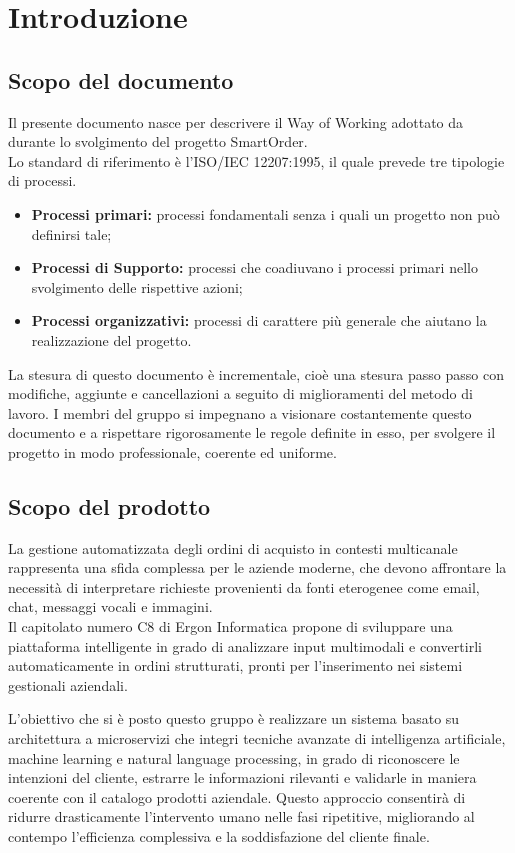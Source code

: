 \section{Introduzione}
	\subsection{Scopo del documento}
	Il presente documento nasce per descrivere il Way of Working adottato da \textbf{} durante lo svolgimento del progetto SmartOrder.\\
	Lo standard di riferimento è l'ISO/IEC 12207:1995, il quale prevede tre tipologie di processi.
	\begin{itemize}
	    \setlength\itemsep{-0.1em}
	    \item \textbf{Processi primari:} processi fondamentali senza i quali un progetto non può definirsi tale;
	    \item \textbf{Processi di Supporto:} processi che coadiuvano i processi primari nello svolgimento delle rispettive azioni;
	    \item \textbf{Processi organizzativi:} processi di carattere più generale che aiutano la realizzazione del progetto.
	\end{itemize}

	La stesura di questo documento è incrementale, cioè una stesura passo passo con modifiche, aggiunte e cancellazioni a seguito di miglioramenti del metodo di lavoro. I membri del gruppo si impegnano a visionare costantemente questo documento e a rispettare rigorosamente le regole definite in esso, per svolgere il progetto in modo professionale, coerente ed uniforme.

\subsection{Scopo del prodotto}
	La gestione automatizzata degli ordini di acquisto in contesti multicanale rappresenta una sfida complessa per le aziende moderne, che devono affrontare la necessità di interpretare richieste provenienti da fonti eterogenee come email, chat, messaggi vocali e immagini.\\
	Il capitolato numero C8 di Ergon Informatica propone di sviluppare una piattaforma intelligente in grado di analizzare input multimodali e convertirli automaticamente in ordini strutturati, pronti per l'inserimento nei sistemi gestionali aziendali.

	L'obiettivo che si è posto questo gruppo è realizzare un sistema basato su architettura a microservizi che integri tecniche avanzate di intelligenza artificiale, machine learning e natural language processing, in grado di riconoscere le intenzioni del cliente, estrarre le informazioni rilevanti e validarle in maniera coerente con il catalogo prodotti aziendale. Questo approccio consentirà di ridurre drasticamente l'intervento umano nelle fasi ripetitive, migliorando al contempo l'efficienza complessiva e la soddisfazione del cliente finale.

